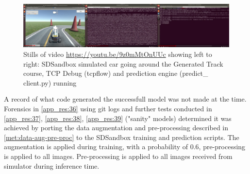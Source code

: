 \begin{figure}[h!]
\centering
\includegraphics[width=\textwidth]{Figures/SimTCPPred.png}
\caption{Stills of video \url{https://youtu.be/9z0mMtOnUUc} showing left to right: SDSandbox simulated car going around the Generated Track course, TCP Debug (tcpflow) and prediction engine (predict\_ client.py) running}
\label{fig:SimTCPPred}
\end{figure}

A record of what code generated the successfull model was not made at the time. Forensics in \ref{app_res:36} using git logs and further tests conducted in \ref{app_res:37}, \ref{app_res:38}, \ref{app_res:39} ("sanity" models) determined it was achieved by porting the data augmentation and pre-processing described in \ref{met:data-aug-pre-proc} to the SDSandbox training and prediction scripts. The augmentation is applied during training, with a probability of 0.6, pre-processing is applied to all images. Pre-processing is applied to all images received from simulator during inference time.


